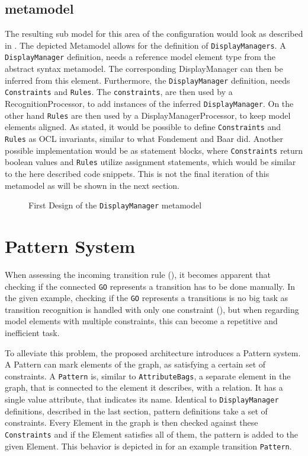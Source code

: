 \subsection{metamodel}
The resulting sub model for this area of the configuration would look as described in . The depicted Metamodel allows for the definition of \texttt{DisplayManagers}. A \texttt{DisplayManager} definition, needs a reference model element type from the abstract syntax metamodel. The corresponding DisplayManager can then be inferred from this element. Furthermore, the \texttt{DisplayManager} definition, needs \texttt{Constraints} and \texttt{Rules}. The \texttt{constraints}, are then used by a RecognitionProcessor, to add instances of the inferred \texttt{DisplayManager}. On the other hand \texttt{Rules} are then used by a DisplayManagerProcessor, to keep model elements aligned. As stated, it would be possible to define \texttt{Constraints} and \texttt{Rules} as OCL invariants, similar to what Fondement and Baar did. Another possible implementation would be as statement blocks, where \texttt{Constraints} return boolean values and \texttt{Rules} utilize assignment statements, which would be similar to the here described code snippets. This is not the final iteration of this metamodel as will be shown in the next section.

\begin{figure}
  \centering
  
  \caption{First Design of the \texttt{DisplayManager} metamodel}
  \label{fig:initial-syntax-model}
\end{figure}


\section{Pattern System}
When assessing the incoming transition rule (), it becomes apparent that checking if the connected \texttt{GO} represents a transition has to be done manually. In the given example, checking if the \texttt{GO} represents a transitions is no big task as transition recognition is handled with only one constraint (), but when regarding model elements with multiple constraints, this can become a repetitive and inefficient task.

To alleviate this problem, the proposed architecture introduces a Pattern system. A Pattern can mark elements of the graph, as satisfying a certain set of constraints. A \texttt{Pattern} is, similar to \texttt{AttributeBags}, a separate element in the graph, that is connected to the element it describes, with a relation. It has a single value attribute, that indicates its name. Identical to \texttt{DisplayManager} definitions, described in the last section, pattern definitions take a set of constraints. Every Element in the graph is then checked against these \texttt{Constraints} and if the Element satisfies all of them, the pattern is added to the given Element. This behavior is depicted in  for an example transition \texttt{Pattern}.

